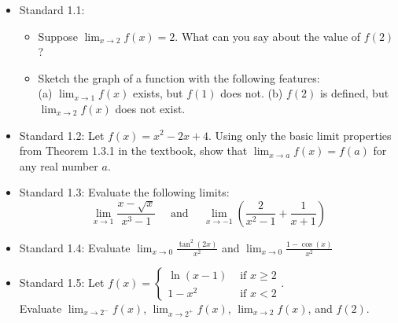 \documentclass[10pt]{beamer}
\newcommand{\di}{\displaystyle}
\begin{document}


\begin{frame}
\begin{itemize}
\item Standard 1.1: \begin{itemize}
\item Suppose $\di \lim_{x\to 2}f(x)=2$. What can you say about the value of $f(2)$? 
\item Sketch the graph of a function with the following features:\\ (a) $\di\lim_{x\to 1}f(x)$ exists, but $f(1)$ does not. (b) $f(2)$ is defined, but $\di\lim_{x\to 2}f(x)$ does not exist.
\end{itemize}
\item Standard 1.2: Let $f(x)=x^2-2x+4$. Using only the basic limit properties from Theorem 1.3.1 in the textbook, show that $\di \lim_{x\to a}f(x) = f(a)$ for any real number $a$. 
\item Standard 1.3: Evaluate the following limits:
\[
\lim_{x\to 1}\frac{x-\sqrt{x}}{x^3-1} \quad \text{ and } \quad \lim_{x\to -1}\left(\frac{2}{x^2-1}+\frac{1}{x+1}\right)
\]
\item Standard 1.4: Evaluate $\di\lim_{x\to 0}\frac{\tan^2(2x)}{x^2}$ and $\di \lim_{x\to 0}\frac{1-\cos(x)}{x^2}$
\item Standard 1.5: Let $f(x)=\begin{cases}\ln(x-1) & \text{ if } x\geq 2\\ 1-x^2 & \text{ if } x<2\end{cases}$.\\ Evaluate
$\di\lim_{x\to 2^-}f(x)$, $\di\lim_{x\to 2^+}f(x)$, $\di \lim_{x\to 2}f(x)$, and $f(2)$.
\end{itemize}
\end{frame}
\end{document}
